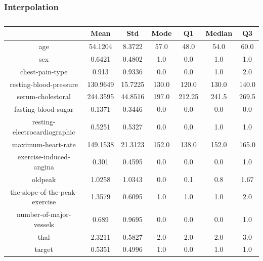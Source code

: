 \documentclass{classrep}
\begin{document}
{{{            }

            \subsubsection{Interpolation}
            \label{results:30-percent:interpolation} {
                \begin{table}[!htbp]
                    \centering
                    \begin{tabular}{|c|c|c|c|c|c|c|}
                        \hline
                        & Mean & Std & Mode & Q1 & Median & Q3 \\ \hline
                        age & 54.1204 & 8.3722 & 57.0 & 48.0 & 54.0 & 60.0 \\ \hline
                        sex & 0.6421 & 0.4802 & 1.0 & 0.0 & 1.0 & 1.0 \\ \hline
                        chest-pain-type & 0.913 & 0.9336 & 0.0 & 0.0 & 1.0 & 2.0 \\ \hline
                        resting-blood-pressure & 130.9649 & 15.7225 & 130.0 & 120.0 & 130.0 & 140.0 \\ \hline
                        serum-cholestoral & 244.3595 & 44.8516 & 197.0 & 212.25 & 241.5 & 269.5 \\ \hline
                        fasting-blood-sugar & 0.1371 & 0.3446 & 0.0 & 0.0 & 0.0 & 0.0 \\ \hline
                        resting-electrocardiographic & 0.5251 & 0.5327 & 0.0 & 0.0 & 1.0 & 1.0 \\ \hline
                        maximum-heart-rate & 149.1538 & 21.3123 & 152.0 & 138.0 & 152.0 & 165.0 \\ \hline
                        exercise-induced-angina & 0.301 & 0.4595 & 0.0 & 0.0 & 0.0 & 1.0 \\ \hline
                        oldpeak & 1.0258 & 1.0343 & 0.0 & 0.1 & 0.8 & 1.67 \\ \hline
                        the-slope-of-the-peak-exercise & 1.3579 & 0.6095 & 1.0 & 1.0 & 1.0 & 2.0 \\ \hline
                        number-of-major-vessels & 0.689 & 0.9695 & 0.0 & 0.0 & 0.0 & 1.0 \\ \hline
                        thal & 2.3211 & 0.5827 & 2.0 & 2.0 & 2.0 & 3.0 \\ \hline
                        target & 0.5351 & 0.4996 & 1.0 & 0.0 & 1.0 & 1.0 \\ \hline
                    \end{tabular}
                    \caption{}
                    \label{result_30_Interpolation}
                \end{table}
                \FloatBarrier

}}}
\end{document}
